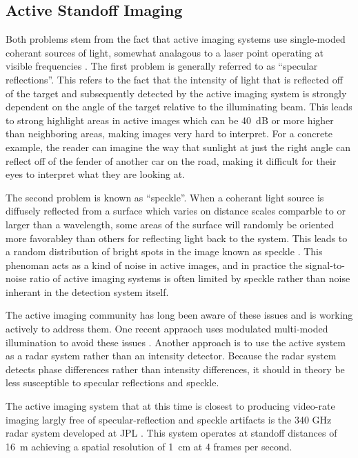 \subsection{Active Standoff Imaging}

Both problems stem from the fact that active imaging systems use single-moded coherant sources of light, somewhat analagous to a laser point operating at visible frequencies \cite{petkie_active_2008}.
The first problem is generally referred to as ``specular reflections''.
This refers to the fact that the intensity of light that is reflected off of the target and subsequently detected by the active imaging system is strongly dependent on the angle of the target relative to the illuminating beam.
This leads to strong highlight areas in active images which can be \SI{40}{\dB} or more higher than neighboring areas, making images very hard to interpret.
For a concrete example, the reader can imagine the way that sunlight at just the right angle can reflect off of the fender of another car on the road, making it difficult for their eyes to interpret what they are looking at.

The second problem is known as ``speckle''.
When a coherant light source is diffusely reflected from a surface which varies on distance scales comparble to or larger than a wavelength, some areas of the surface will randomly be oriented more favorabley than others for reflecting light back to the system.
This leads to a random distribution of bright spots in the image known as speckle \cite{goodman_fundamental_1976}.
This phenoman acts as a kind of noise in active images, and in practice the signal-to-noise ratio of active imaging systems is often limited by speckle rather than noise inherant in the detection system itself.

The active imaging community has long been aware of these issues and is working actively to address them.
One recent appraoch uses modulated multi-moded illumination to avoid these issues \cite{petkie_multimode_2012,patrick_elimination_2012}.
Another approach is to use the active system as a radar system rather than an intensity detector.
Because the radar system detects phase differences rather than intensity differences, it should in theory be less susceptible to specular reflections and speckle.

The active imaging system that at this time is closest to producing video-rate imaging largly free of specular-reflection and speckle artifacts is the 340 GHz radar system developed at JPL \cite{cooper_thz_2011}.
This system operates at standoff distances of \SI{16}{\m} achieving a spatial resolution of \SI{1}{\cm} at 4 frames per second.

